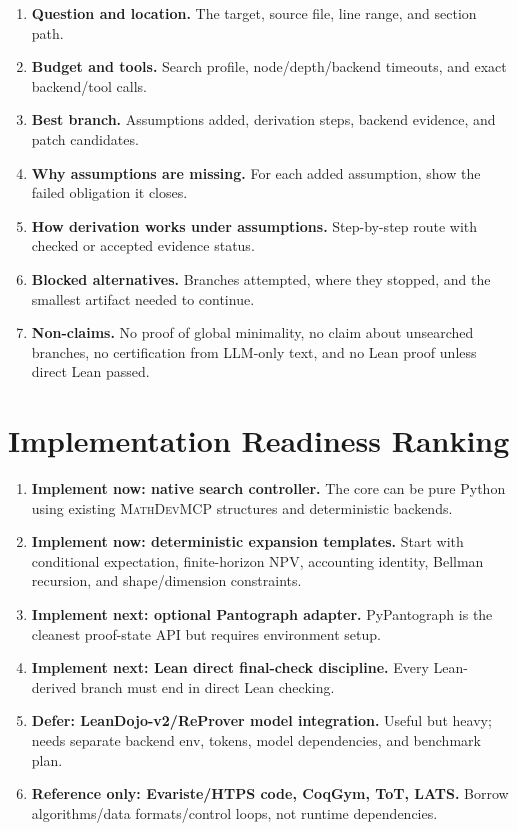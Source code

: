 \documentclass[11pt]{article}
\newcommand{\MathDevMCP}{\textsc{MathDevMCP}}
\begin{document}
\begin{enumerate}[leftmargin=*]
\item \textbf{Question and location.} The target, source file, line range, and
  section path.
\item \textbf{Budget and tools.} Search profile, node/depth/backend timeouts,
  and exact backend/tool calls.
\item \textbf{Best branch.} Assumptions added, derivation steps, backend
  evidence, and patch candidates.
\item \textbf{Why assumptions are missing.} For each added assumption, show the
  failed obligation it closes.
\item \textbf{How derivation works under assumptions.} Step-by-step route with
  checked or accepted evidence status.
\item \textbf{Blocked alternatives.} Branches attempted, where they stopped,
  and the smallest artifact needed to continue.
\item \textbf{Non-claims.} No proof of global minimality, no claim about
  unsearched branches, no certification from LLM-only text, and no Lean proof
  unless direct Lean passed.
\end{enumerate}

\section{Implementation Readiness Ranking}

\begin{enumerate}[leftmargin=*]
\item \textbf{Implement now: native search controller.}
  The core can be pure Python using existing \MathDevMCP{} structures and
  deterministic backends.
\item \textbf{Implement now: deterministic expansion templates.}
  Start with conditional expectation, finite-horizon NPV, accounting identity,
  Bellman recursion, and shape/dimension constraints.
\item \textbf{Implement next: optional Pantograph adapter.}
  PyPantograph is the cleanest proof-state API but requires environment setup.
\item \textbf{Implement next: Lean direct final-check discipline.}
  Every Lean-derived branch must end in direct Lean checking.
\item \textbf{Defer: LeanDojo-v2/ReProver model integration.}
  Useful but heavy; needs separate backend env, tokens, model dependencies, and
  benchmark plan.
\item \textbf{Reference only: Evariste/HTPS code, CoqGym, ToT, LATS.}
  Borrow algorithms/data formats/control loops, not runtime dependencies.
\end{enumerate}
\end{document}
